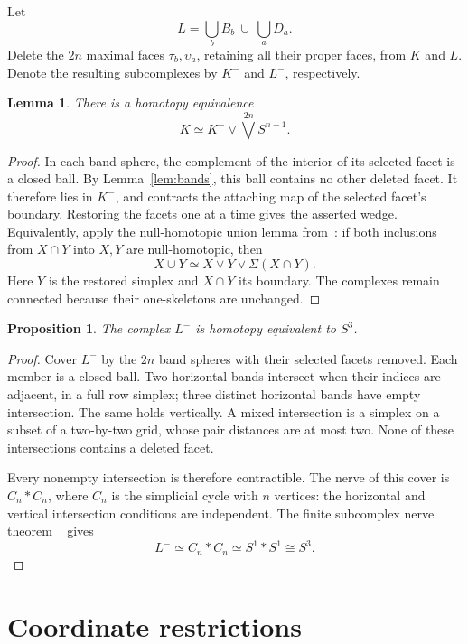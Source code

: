 \documentclass[11pt]{amsart}
\newtheorem{lemma}[theorem]{Lemma}
\newtheorem{proposition}[theorem]{Proposition}
\begin{document}
Let
\[
L=\bigcup_b B_b\ \cup\ \bigcup_a D_a.
\]
Delete the \(2n\) maximal faces \(\tau_b,\upsilon_a\), retaining all their
proper faces, from \(K\) and \(L\). Denote the resulting subcomplexes by
\(K^-\) and \(L^-\), respectively.

\begin{lemma}\label{lem:split}
There is a homotopy equivalence
\[
K\simeq K^-\vee\bigvee^{2n}S^{n-1}.
\]
\end{lemma}

\begin{proof}
In each band sphere, the complement of the interior of its selected facet
is a closed ball. By Lemma~\ref{lem:bands}, this ball contains no other
deleted facet. It therefore lies in \(K^-\), and contracts the attaching
map of the selected facet's boundary.
Restoring the facets one at a time gives the asserted wedge.
Equivalently, apply the null-homotopic union lemma
from~\cite[Lemma~5.7]{torus}: if both inclusions from \(X\cap Y\)
into \(X,Y\) are null-homotopic, then
\[
X\cup Y\simeq X\vee Y\vee\Sigma(X\cap Y).
\]
Here \(Y\) is the restored simplex and \(X\cap Y\) its boundary.
The complexes remain connected because their one-skeletons are unchanged.
\end{proof}

\begin{proposition}\label{prop:band-nerve}
The complex \(L^-\) is homotopy equivalent to \(S^3\).
\end{proposition}

\begin{proof}
Cover \(L^-\) by the \(2n\) band spheres with their selected facets removed.
Each member is a closed ball. Two horizontal bands intersect when their
indices are adjacent, in a full row simplex; three distinct horizontal
bands have empty intersection. The same holds vertically.
A mixed intersection is a simplex on a subset of a two-by-two grid,
whose pair distances are at most two. None of these intersections
contains a deleted facet.

Every nonempty intersection is therefore contractible. The nerve of this
cover is \(C_n*C_n\), where \(C_n\) is the simplicial cycle with \(n\)
vertices: the horizontal and vertical intersection conditions are
independent. The finite subcomplex nerve theorem
~\cite[Theorem~10.6(i)]{bjorner} gives
\[
L^-\simeq C_n*C_n\simeq S^1*S^1\cong S^3.
\]
\end{proof}

\section{Coordinate restrictions}
\end{document}
